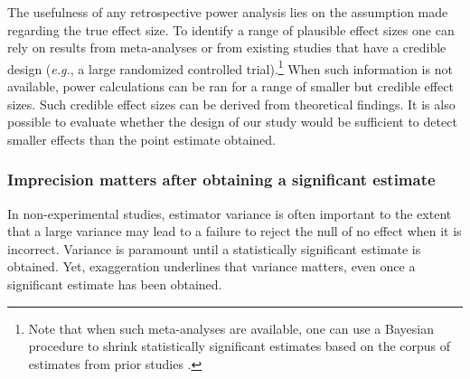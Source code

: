 \documentclass[usletter, 12pt]{article}
\begin{document}
				The usefulness of any retrospective power analysis lies on the assumption made regarding the true effect size. To identify a range of plausible effect sizes one can rely on results from meta-analyses or from existing studies that have a credible design (\textit{e.g.}, a large randomized controlled trial).\footnote{Note that when such meta-analyses are available, one can use a Bayesian procedure to shrink statistically significant estimates based on the corpus of estimates from prior studies \cite{zwet_proposal_2021, zwet_significance_2021, zwet_statistical_2021} .} When such information is not available, power calculations can be ran for a range of smaller but credible effect sizes. Such credible effect sizes can be derived from theoretical findings. It is also possible to evaluate whether the design of our study would be sufficient to detect smaller effects than the point estimate obtained.
				
		
		
		\subsubsection{Imprecision matters after obtaining a significant estimate}
			
				In non-experimental studies, estimator variance is often important to the extent that a large variance may lead to a failure to reject the null of no effect when it is incorrect. Variance is paramount until a statistically significant estimate is obtained. Yet, exaggeration underlines that variance matters, even once a significant estimate has been obtained. 
			
\end{document}

